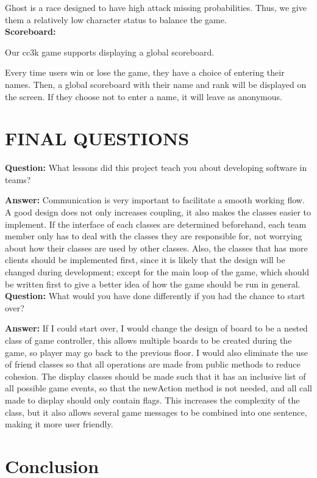 \documentclass[11pt]{article}
\theoremstyle{plain} \newtheorem{theorem*}{Theorem}[subsection]
\begin{document}
Ghost is a race designed to have high attack missing probabilities. Thus, we 
give them a relatively low character status to balance the game. \\

\textbf{Scoreboard: }

Our cc3k game supports displaying a global scoreboard. 

Every time users win or lose the game, they have a choice of entering their 
names. Then, a global scoreboard with their name and rank will be displayed on 
the screen. If they choose not to enter a name, it will leave as anonymous.  




\section{FINAL QUESTIONS}

\textbf{Question:}
What lessons did this project teach you about developing software in teams? 

\textbf{Answer:}
Communication is very important to facilitate a smooth working flow. A good
design does not only increases coupling, it also makes the classes easier to
implement. If the interface of each classes are determined beforehand, each
team member only has to deal with the classes they are responsible for, not
worrying about how their classes are used by other classes. Also, the classes
that has more clients should be implemented first, since it is likely that the
design will be changed during development; except for the main loop of the
game, which should be written first to give a better idea of how the game
should be run in general.  \\

\textbf{Question:}
What would you have done differently if you had the chance to start over? 

\textbf{Answer:}
If I could start over, I would change the design of board to be a nested class
of game controller, this allows multiple boards to be created during the game,
so player may go back to the previous floor. I would also eliminate the use of
friend classes so that all operations are made from public methods to reduce
cohesion. The display classes should be made such that it has an inclusive list
of all possible game events, so that the newAction method is not needed, and
all call made to display should only contain flags. This increases the
complexity of the class, but it also allows several game messages to be
combined into one sentence, making it more user friendly.  




\section{Conclusion}
\end{document}
